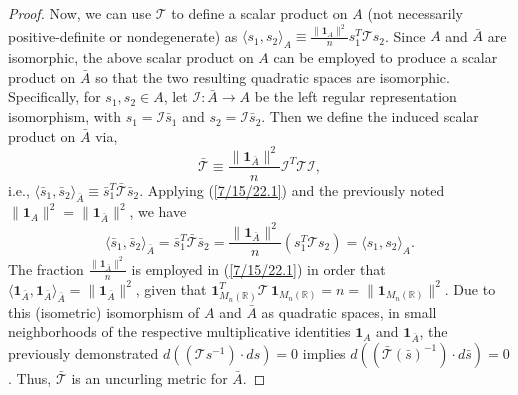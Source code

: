 \documentclass{amsart}
\numberwithin{equation}{section}
\theoremstyle{definition}
\numberwithin{theorem}{section}
\begin{document}
\begin{proof}
   Now, we can use $\mathcal{\mathcal{T}}$ to define a scalar product on $A$ (not necessarily positive-definite or nondegenerate) as $\langle s_1,s_2\rangle_A \equiv  \frac{\|\mathbf{1}_{A}\|^2}{n}s_1^T \mathcal{\mathcal{T}} s_2$. 
    Since $A$ and $\bar{A}$ are isomorphic, the above scalar product on $A$ can be employed to produce a scalar product on $\bar{A}$ so that the two resulting quadratic spaces are isomorphic.  Specifically,  for $s_1,s_2\in A$, let $ \mathcal{I}:\bar{A}\rightarrow A$ be the left regular representation isomorphism, with $s_1 = \mathcal{I}\bar{s}_1$ and $s_2= \mathcal{I}\bar{s}_2 $.  Then we define the induced scalar product on $\bar{A}$ via, \begin{equation}\label{7/15/22.1} \bar{\mathcal{\mathcal{T}}} \equiv  \frac{\|\mathbf{1}_{\bar{A}}\|^2}{n}\mathcal{I}^T\mathcal{\mathcal{T}}\mathcal{I},\end{equation} i.e., $\langle \bar{s}_1,\bar{s}_2\rangle_{\bar{A}} \equiv \bar{s}_1^T \bar{\mathcal{\mathcal{T}}} \bar{s}_2$.  Applying (\ref{7/15/22.1}) and the previously noted $\|\mathbf{1}_A\|^2 = \|\mathbf{1}_{\bar{A}}\|^2$, we have \begin{equation}\label{8/25/22.1} \langle \bar{s}_1,\bar{s}_2\rangle_{\bar{A}} = \bar{s}_1^T \bar{\mathcal{T}} \bar{s}_2 = \frac{\|\mathbf{1}_{\bar{A}}\|^2}{n}( s_1^T \mathcal{T} s_2) = \langle s_1,s_2\rangle_{A}.\end{equation}  The fraction $\frac{\|\mathbf{1}_{\bar{A}}\|^2}{n}$ is employed in (\ref{7/15/22.1}) in order that $\langle \mathbf{1}_{\bar{A}},\mathbf{1}_{\bar{A}}\rangle_{\bar{A}} = \|\mathbf{1}_{\bar{A}}\|^2$, given that $\mathbf{1}_{M_n(\mathbb{R})}^T \mathcal{T}\,\mathbf{1}_{M_n(\mathbb{R})} = n = \|\mathbf{1}_{M_n(\mathbb{R})}\|^2$. Due to this (isometric) isomorphism of $A$ and $\bar{A}$ as quadratic spaces,  in small neighborhoods of the respective multiplicative identities $\mathbf{1}_A$ and $\mathbf{1}_{\bar{A}}$, the previously demonstrated $d((\mathcal{T}s^{-1})\cdot ds) = 0$ implies 
\mbox{$d((\bar{\mathcal{T}}(\bar{s})^{-1})\cdot d\bar{s}) = 0$.} Thus, $\bar{\mathcal{T}}$ is an uncurling metric for $\bar{A}$.



\end{proof}
\end{document}
